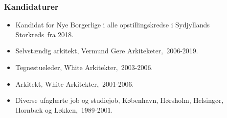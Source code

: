 \documentclass[11pt, a4paper]{awesome-cv}
\begin{document}
\begin{cvletter}
\subsubsection*{Kandidaturer}
\begin{itemize}
\item Kandidat for Nye Borgerlige i alle opstillingskredse i Sydjyllands Storkreds fra 2018.
\end{itemize}
\begin{itemize}
\item Selvstændig arkitekt, Vermund Gere Arkiteketer, 2006-2019.
\item Tegnestueleder, White Arkitekter, 2003-2006.
\item Arkitekt, White Arkitekter, 2001-2006.
\item Diverse ufaglærte job og studiejob, København, Hørsholm, Helsingør, Hornbæk og Løkken, 1989-2001.
\end{itemize}
\end{cvletter}
\end{document}
